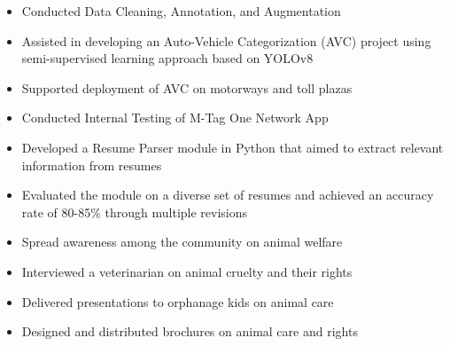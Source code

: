 \documentclass[10pt,a4paper,ragged2e,withhyper]{altacv}
\begin{document}


\makecvheader


\begin{paracol}{2}


\begin{itemize}
\item Conducted Data Cleaning, Annotation, and Augmentation
\item Assisted in developing an Auto-Vehicle Categorization (AVC) project using semi-supervised learning approach based on YOLOv8
\item Supported deployment of AVC on motorways and toll plazas
\item Conducted Internal Testing of M-Tag One Network App
\end{itemize}

\divider

\begin{itemize}
\item Developed a Resume Parser module in Python that aimed to extract relevant information from resumes
\item Evaluated the module on a diverse set of resumes and achieved an accuracy rate of 80-85\% through multiple revisions
\end{itemize}

\divider

\begin{itemize}
\item Spread awareness among the community on animal welfare
\item Interviewed a veterinarian on animal cruelty and their rights
\item Delivered presentations to orphanage kids on animal care
\item Designed and distributed brochures on animal care and rights
\end{itemize}



\end{paracol}
\end{document}
